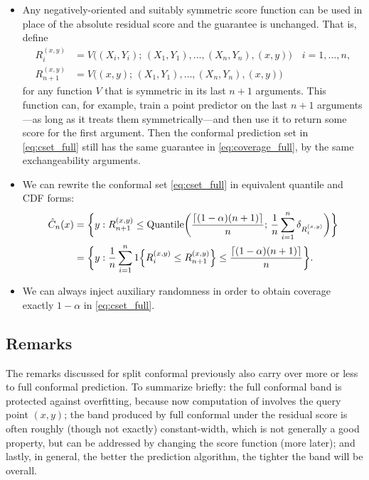 \documentclass{article}
\begin{document}
\begin{itemize}
\item Any negatively-oriented and suitably symmetric score function can be used
  in place of the absolute residual score and the guarantee is unchanged. That
  is, define 
  \begin{align*}
  R_i^{(x,y)} &= V\Big( (X_i,Y_i); \, (X_1,Y_1), \dots, (X_n,Y_n), (x,y) \Big)
  \quad i=1,\dots,n, \\ 
  R_{n+1}^{(x,y)} &= V\Big( (x,y); \, (X_1,Y_1), \dots, (X_n,Y_n), (x,y) \Big)
  \end{align*}
  for any function $V$ that is symmetric in its last $n+1$ arguments. This
  function can, for example, train a point predictor on the last $n+1$
  arguments---as long as it treats them symmetrically---and then use it to
  return some score for the first argument. Then the conformal prediction set in
  \eqref{eq:cset_full} still has the same guarantee in \eqref{eq:coverage_full},
  by the same exchangeability arguments. 

\item We can rewrite the conformal set \eqref{eq:cset_full} in equivalent
  quantile and CDF forms:
\begin{align}
\hat{C}_n(x) 
\label{eq:cset_quant_full}
&= \bigg\{ y : R^{(x,y)}_{n+1} \leq \mathrm{Quantile}\bigg( \frac{\lceil (1-\alpha)(n+1) 
  \rceil}{n}; \, \frac{1}{n} \sum_{i=1}^n \delta_{R_i^{(x,y)}} \bigg) \bigg\} \\ 
\label{eq:cset_cdf_full}
&= \bigg\{ y : \frac{1}{n} \sum_{i=1}^n 1\Big\{ R_i^{(x,y)} \leq R^{(x,y)}_{n+1}
  \Big\} \leq \frac{\lceil (1-\alpha)(n+1) \rceil}{n} \bigg\}.   
\end{align}

\item We can always inject auxiliary randomness in order to obtain coverage
  exactly $1-\alpha$ in \eqref{eq:cset_full}.
\end{itemize}

\subsection{Remarks}

The remarks discussed for split conformal previously also carry over more or
less to full conformal prediction. To summarize briefly: the full conformal band
is protected against overfitting, because now computation of
 involves the query point $(x,y)$; the band produced by
full conformal under the residual score is often roughly (though not exactly)
constant-width, which is not generally a good property, but can be addressed by
changing the score function (more later); and lastly, in general, the better the
prediction algorithm, the tighter the band will be overall. 
\end{document}
